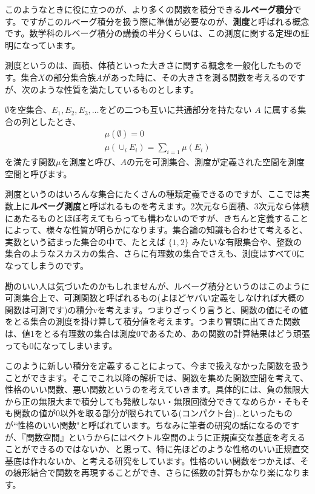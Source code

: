 このようなときに役に立つのが、より多くの関数を積分できる\textbf{ルベーグ積分}です。ですがこのルベーグ積分を扱う際に準備が必要なのが、\textbf{測度}と呼ばれる概念です。数学科のルベーグ積分の講義の半分くらいは、この測度に関する定理の証明になっています。

測度というのは、面積、体積といった大きさに関する概念を一般化したものです。集合$X$の部分集合族$A$があった時に、その大きさを測る関数を考えるのですが、次のような性質を満たしているものとします。

$\emptyset$を空集合、$E_1,E_2,E_3,\dotsc$をどの二つも互いに共通部分を持たない $A$ に属する集合の列としたとき、
\begin{gather*}
\mu (\emptyset) = 0 \\
\mu (\cup_i E_i) = \sum_{i=1} \mu (E_i)
\end{gather*}
を満たす関数$\mu$を測度と呼び、$A$の元を可測集合、測度が定義された空間を測度空間と呼びます。

測度というのはいろんな集合にたくさんの種類定義できるのですが、ここでは実数上に\textbf{ルベーグ測度}と呼ばれるものを考えます。2次元なら面積、3次元なら体積にあたるものとほぼ考えてもらっても構わないのですが、きちんと定義することによって、様々な性質が明らかになります。集合論の知識も合わせて考えると、実数という詰まった集合の中で、たとえば $\{1,2\}$ みたいな有限集合や、整数の集合のようなスカスカの集合、さらに有理数の集合でさえも、測度はすべて0になってしまうのです。

勘のいい人は気づいたのかもしれませんが、ルベーグ積分というのはこのように可測集合上で、可測関数と呼ばれるもの(よほどヤバい定義をしなければ大概の関数は可測です)の積分vを考えます。つまりざっくり言うと、関数の値にその値をとる集合の測度を掛け算して積分値を考えます。つまり冒頭に出てきた関数は、値1をとる有理数の集合は測度0であるため、あの関数の計算結果はどう頑張っても0になってしまいます。

このように新しい積分を定義することによって、今まで扱えなかった関数を扱うことができます。そこでこれ以降の解析では、関数を集めた関数空間を考えて、性格のいい関数、悪い関数というのを考えていきます。具体的には、負の無限大から正の無限大まで積分しても発散しない・無限回微分できてなめらか・そもそも関数の値が0以外を取る部分が限られている(コンパクト台)…といったものが``性格のいい関数"と呼ばれています。ちなみに筆者の研究の話になるのですが、『関数空間』というからにはベクトル空間のように正規直交な基底を考えることができるのではないか、と思って、特に先ほどのような性格のいい正規直交基底は作れないか、と考える研究をしています。性格のいい関数をつかえば、その線形結合で関数を再現することができ、さらに係数の計算もかなり楽になります。

